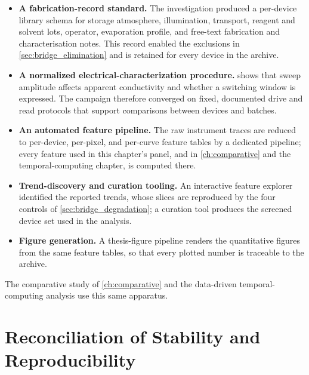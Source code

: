 \documentclass[12pt, twoside]{report}
\begin{document}
\begin{itemize}
  \item \textbf{A fabrication-record standard.} The investigation produced a per-device library schema for storage atmosphere, illumination, transport, reagent and solvent lots, operator, evaporation profile, and free-text fabrication and characterisation notes. This record enabled the exclusions in \cref{sec:bridge_elimination} and is retained for every device in the archive.
  \item \textbf{A normalized electrical-characterization procedure.}  shows that sweep amplitude affects apparent conductivity and whether a switching window is expressed. The campaign therefore converged on fixed, documented drive and read protocols that support comparisons between devices and batches.
  \item \textbf{An automated feature pipeline.} The raw instrument traces are reduced to per-device, per-pixel, and per-curve feature tables by a dedicated pipeline; every feature used in this chapter's panel, and in \cref{ch:comparative} and the temporal-computing chapter, is computed there.
  \item \textbf{Trend-discovery and curation tooling.} An interactive feature explorer identified the reported trends, whose slices are reproduced by the four controls of \cref{sec:bridge_degradation}; a curation tool produces the screened device set used in the analysis.
  \item \textbf{Figure generation.} A thesis-figure pipeline renders the quantitative figures from the same feature tables, so that every plotted number is traceable to the archive.
\end{itemize}

The comparative study of \cref{ch:comparative} and the data-driven temporal-computing analysis use this same apparatus.

\section{Reconciliation of Stability and Reproducibility}\label{sec:bridge_reconciliation}
\end{document}
